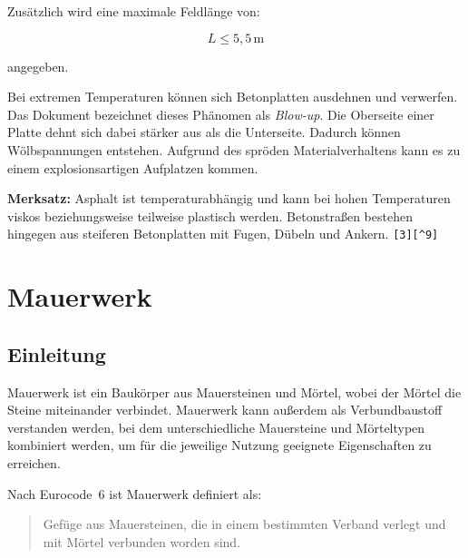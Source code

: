 \documentclass[
  12pt,
  a4paper,
  oneside
]{scrreprt}
\newcommand{\quelle}[1]{\hfill\texttt{#1}}
\begin{document}
Zusätzlich wird eine maximale Feldlänge von:

\begin{equation}
  L \leq 5{,}5\,\mathrm{m}
\end{equation}

angegeben.


Bei extremen Temperaturen können sich Betonplatten ausdehnen und
verwerfen. Das Dokument bezeichnet dieses Phänomen als
\textit{Blow-up}. Die Oberseite einer Platte dehnt sich dabei stärker
aus als die Unterseite. Dadurch können Wölbspannungen entstehen.
Aufgrund des spröden Materialverhaltens kann es zu einem
explosionsartigen Aufplatzen kommen.


\begin{merksatzbox}
\textbf{Merksatz:}
Asphalt ist temperaturabhängig und kann bei hohen Temperaturen viskos
beziehungsweise teilweise plastisch werden. Betonstraßen bestehen
hingegen aus steiferen Betonplatten mit Fugen, Dübeln und Ankern.
\quelle{[3][^9]}
\end{merksatzbox}

\chapter{Mauerwerk}

\section{Einleitung}

Mauerwerk ist ein Baukörper aus Mauersteinen und Mörtel, wobei der
Mörtel die Steine miteinander verbindet. Mauerwerk kann außerdem als
Verbundbaustoff verstanden werden, bei dem unterschiedliche
Mauersteine und Mörteltypen kombiniert werden, um für die jeweilige
Nutzung geeignete Eigenschaften zu erreichen.


Nach Eurocode~6 ist Mauerwerk definiert als:

\begin{quote}
\glqq Gefüge aus Mauersteinen, die in einem bestimmten Verband verlegt
und mit Mörtel verbunden worden sind.\grqq
\end{quote}
\end{document}
